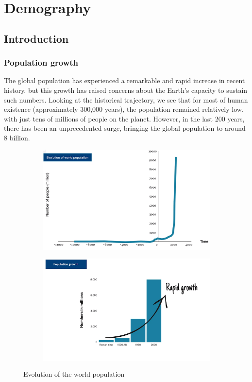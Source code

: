 \documentclass[../summary.tex]{subfiles}
\begin{document}
\section{Demography}
\subsection{Introduction}
\subsubsection{Population growth}

The global population has experienced a remarkable and rapid increase in recent history, but this growth has raised concerns about the Earth's capacity to sustain such numbers. Looking at the historical trajectory, we see that for most of human existence (approximately 300,000 years), the population remained relatively low, with just tens of millions of people on the planet. However, in the last 200 years, there has been an unprecedented surge, bringing the global population to around 8 billion.

\begin{figure}[H]
	\centering
	\begin{subfigure}{.5\textwidth}
		\centering
		\includegraphics[width=1\linewidth]{../images/evolution_of_population}
		\caption{}
		\label{fig:evoltionofpopulation2}
	\end{subfigure}%
	\begin{subfigure}{.5\textwidth}
		\centering
		\includegraphics[width=0.9\linewidth]{../images/evolution_of_population_2}
		\caption{}
		\label{fig:evoltionofpopulation3}
	\end{subfigure}
	\caption{Evolution of the world population}
	\label{fig:evoltionofpopulation}
\end{figure}
\end{document}

